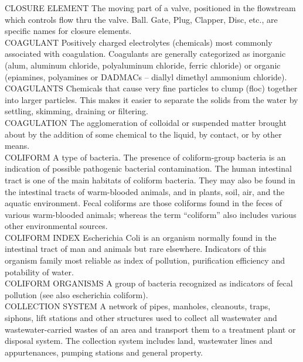 CLOSURE ELEMENT
The moving part of a valve, positioned in the flowstream which controls flow thru the valve. Ball. Gate, Plug, Clapper, Disc, etc., are specific names for closure elements.
\vspace{0.3cm}\\
COAGULANT
Positively charged electrolytes (chemicals) most commonly associated with coagulation. Coagulants are generally categorized as inorganic (alum, aluminum chloride, polyaluminum chloride, ferric chloride) or organic (epiamines, polyamines or DADMACs – diallyl dimethyl ammonium chloride).
\vspace{0.3cm}\\
COAGULANTS
Chemicals that cause very fine particles to clump (floc) together into larger particles. This makes it easier to separate the solids from the water by settling, skimming, draining or filtering.
\vspace{0.3cm}\\
COAGULATION
The agglomeration of colloidal or suspended matter brought about by the addition of some chemical to the liquid, by contact, or by other means.
\vspace{0.3cm}\\
COLIFORM
A type of bacteria. The presence of coliform-group bacteria is an indication of possible pathogenic bacterial contamination. The human intestinal tract is one of the main habitats of coliform bacteria. They may also be found in the intestinal tracts of warm-blooded animals, and in plants, soil, air, and the aquatic environment. Fecal coliforms are those coliforms found in the feces of various warm-blooded animals; whereas the term “coliform” also includes various other environmental sources.
\vspace{0.3cm}\\
COLIFORM INDEX
Escherichia Coli is an organism normally found in the intestinal tract of man and animals but rare elsewhere.  Indicators of this organism family most reliable as index of pollution, purification efficiency and potability of water.
\vspace{0.3cm}\\
COLIFORM ORGANISMS
A group of bacteria recognized as indicators of fecal pollution (see also escherichia coliform).
\vspace{0.3cm}\\
COLLECTION SYSTEM
A network of pipes, manholes, cleanouts, traps, siphons, lift stations and other structures used to collect all wastewater and wastewater-carried wastes of an area and transport them to a treatment plant or disposal system. The collection system includes land, wastewater lines and appurtenances, pumping stations and general property. 
